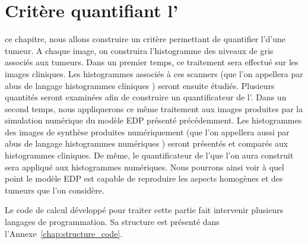 \documentclass[main.tex]{subfiles}
\begin{document}



\chapter{Critère quantifiant l'\hetero \label{chap:crit_hetero}}
 ce chapitre, nous allons construire un critère permettant de quantifier l'\hetero d'une tumeur.
A chaque image, on construira l'histogramme des niveaux de gris associés aux tumeurs. 
Dans un premier temps, ce traitement sera effectué sur les images cliniques. %
Les histogrammes associés à ces scanners (que l'on appellera par abus de langage \og histogrammes cliniques \fg) seront ensuite étudiés. Plusieurs quantités seront examinées afin de construire un quantificateur de l'\hetero.
Dans un second temps, nous appliquerons ce même traitement aux images produites par la simulation numérique du modèle EDP présenté précédemment. Les histogrammes des images de synthèse produites numériquement (que l'on appellera aussi par abus de langage \og histogrammes numériques \fg) seront présentés et comparés aux histogrammes cliniques. De même, le quantificateur de l'\hetero que l'on aura construit sera appliqué aux histogrammes numériques. Nous pourrons ainsi voir à quel point le modèle EDP est capable de reproduire les aspects homogènes et \heterogenes des tumeurs que l'on considère.


Le code de calcul développé pour traiter cette partie fait intervenir plusieurs langages de programmation. Sa structure est présenté dans l'Annexe~\ref{chap:structure_code}. 
\end{document}

